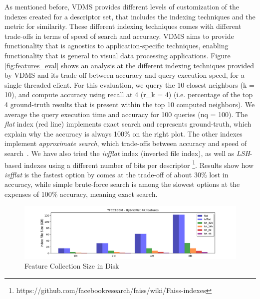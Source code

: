 As mentioned before, VDMS provides different levels of customization of the
indexes created for a descriptor set, that includes the indexing techniques
and the metric for similarity.
These different indexing techniques comes with different trade-offs in terms
of speed of search and accuracy.
VDMS aims to provide functionality that is agnostics to application-specific
techniques, enabling functionality that is general to visual data processing
applications.
Figure \ref{fig:features_eval} shows an analysis at the different indexing
techniques provided by VDMS and its trade-off between accuracy and query
execution speed, for a single threaded client.
For this evaluation, we query the 10 closest neighbors (k = 10), and compute
accuracy using recall at 4 (r\_k = 4) (i.e. percentage of the top 4 ground-truth
results that is present within the top 10 computed neighbors).
We average the query execution time and accuracy for 100 queries (nq = 100).
The \textit{flat} index (red line) implements exact search and
represents ground-truth, which explain why the accuracy is always 100\% on the
right plot. The other indexes implement \textit{approximate search},
which trade-offs between accuracy and speed of search~\cite{flann, faiss}.
We have also tried the \textit{ivfflat} index (inverted file index), as well as
\textit{LSH}-based indexes using a different number of bits per descriptor
\footnote{https://github.com/facebookresearch/faiss/wiki/Faiss-indexes}.
Results show how \textit{ivfflat} is the fastest option by comes at the trade-off
of about 30\% lost in accuracy, while simple brute-force search
is among the slowest options at the expenses of 100\% accuracy,
meaning exact search.

\begin{figure}[]
\centering
\includegraphics[width=\textwidth]{figures/features_disksize}
\caption{Feature Collection Size in Disk}
\label{fig:features_size_does_matter}
\end{figure}

